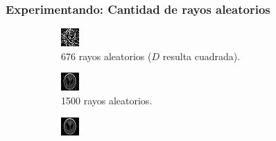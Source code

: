 \documentclass{beamer}
\begin{document}
\begin{frame}
\frametitle{Experimentando: Cantidad de rayos aleatorios}

\begin{figure}
\centering
\begin{subfigure}{0.4\linewidth}
  \centering
  \includegraphics[width=0.6\linewidth]{rayos/phantom-aleat676}
  \caption{676 rayos aleatorios ($D$ resulta cuadrada).}
\end{subfigure}%
\begin{subfigure}{0.4\linewidth}
  \centering
  \includegraphics[width=0.6\linewidth]{rayos/phantom-aleat1500}
  \caption{1500 rayos aleatorios.}
\end{subfigure}
\begin{subfigure}{0.4\linewidth}
  \centering
  \includegraphics[width=0.6\linewidth]{rayos/phantom-aleat4000}

\end{subfigure}
\end{figure}
\end{frame}
\end{document}
